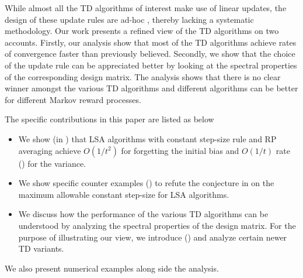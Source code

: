  
While almost all the TD algorithms of interest make use of linear updates, the design of these update rules are ad-hoc \cite{gtdfinite}, thereby lacking a systematic methodology. Our work presents a refined view of the TD algorithms on two accounts. Firstly, our analysis show that most of the TD algorithms achieve rates of convergence faster than previously believed. Secondly, we show that the choice of the update rule can be appreciated better by looking at the spectral properties of the corresponding design matrix. The analysis shows that there is no clear winner amongst the various TD algorithms and different algorithms can be better for different Markov reward processes.\par
The specific contributions in this paper are listed as below
\begin{itemize}[leftmargin=*] 
\item We show (in ) that LSA algorithms with constant step-size rule and RP averaging achieve $O(1/t^2)$ for forgetting the initial bias and $O(1/t)$ rate () for the variance.
\item We show specific counter examples () to refute the conjecture in \cite{bachaistats} on the maximum allowable constant step-size for LSA algorithms.
\item We discuss how the performance of the various TD algorithms can be understood by analyzing the spectral properties of the design matrix. For the purpose of illustrating our view, we introduce () and analyze certain newer TD variants.
\end{itemize}
We also present numerical examples along side the analysis.
